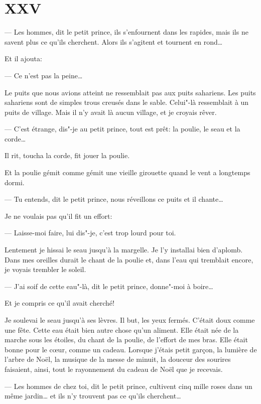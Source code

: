 \section{XXV}
--- Les hommes, dit le petit prince, ils s'enfournent dans les rapides, mais ils ne
savent plus ce qu'ils cherchent. Alors ils s'agitent et tournent en rond\ldots{}

Et il ajouta:

--- Ce n'est pas la peine\ldots{}

Le puits que nous avions atteint ne ressemblait pas aux puits sahariens. Les puits
sahariens sont de simples trous creusés dans le sable. Celui"-là ressemblait à un
puits de village. Mais il n'y avait là aucun village, et je croyais rêver.

--- C'est étrange, dis"-je au petit prince, tout est prêt: la poulie, le seau et
la corde\ldots{}

Il rit, toucha la corde, fit jouer la poulie.

Et la poulie gémit comme gémit une vieille girouette quand le vent a longtemps dormi.

--- Tu entends, dit le petit prince, nous réveillons ce puits et il chante\ldots{}

Je ne voulais pas qu'il fit un effort:

--- Laisse-moi faire, lui dis"-je, c'est trop lourd pour toi.

Lentement je hissai le seau jusqu'à la margelle. Je l'y installai bien d'aplomb.
Dans mes oreilles durait le chant de la poulie et, dans l'eau qui tremblait encore,
je voyais trembler le soleil.

--- J'ai soif de cette eau"-là, dit le petit prince, donne"-moi à boire\ldots{}

Et je compris ce qu'il avait cherché!

Je soulevai le seau jusqu'à ses lèvres. Il but, les yeux fermés. C'était doux comme
une fête. Cette eau était bien autre chose qu'un aliment. Elle était née de la marche
sous les étoiles, du chant de la poulie, de l'effort de mes bras. Elle était bonne
pour le cœur, comme un cadeau. Lorsque j'étais petit garçon, la lumière de l'arbre
de Noël, la musique de la messe de minuit, la douceur des sourires faisaient, ainsi,
tout le rayonnement du cadeau de Noël que je recevais.

--- Les hommes de chez toi, dit le petit prince, cultivent cinq mille roses dans un
même jardin\ldots{} et ils n'y trouvent pas ce qu'ils cherchent\ldots{}

